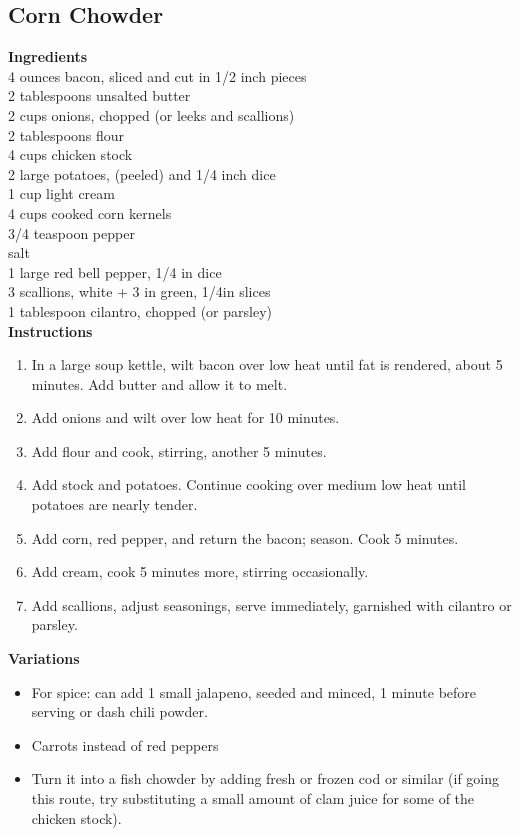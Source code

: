 \documentclass{article}
\numberwithin{figure}{section}
\numberwithin{equation}{section}
\begin{document}
\subsection{Corn Chowder}
{\bf Ingredients}\\
4 ounces bacon, sliced and cut in 1/2 inch pieces\\
2 tablespoons unsalted butter\\
2 cups onions, chopped (or leeks and scallions)\\
2 tablespoons flour\\
4 cups chicken stock\\
2 large potatoes, (peeled) and 1/4 inch dice\\
1 cup light cream\\
4 cups cooked corn kernels\\
3/4 teaspoon pepper\\
salt\\
1 large red bell pepper, 1/4 in dice\\
3 scallions, white + 3 in green, 1/4in slices\\
1 tablespoon cilantro, chopped (or parsley)\\

{\bf Instructions}
\begin{enumerate}
\item In a large soup kettle, wilt bacon over low heat until fat is rendered, about 5 minutes.  Add butter and allow it to melt.
\item Add onions and wilt over low heat for 10 minutes.
\item Add flour and cook, stirring, another 5 minutes.
\item Add stock and potatoes.  Continue cooking over medium low heat until potatoes are nearly tender.
\item Add corn, red pepper, and return the bacon; season.  Cook 5 minutes.
\item Add cream, cook 5 minutes more, stirring occasionally.
\item Add scallions, adjust seasonings, serve immediately, garnished with cilantro or parsley.
\end{enumerate}

{\bf Variations}
\begin{itemize}
\item For spice: can add 1 small jalapeno, seeded and  minced, 1 minute before serving or dash chili powder.
\item Carrots instead of red peppers
\item Turn it into a fish chowder by adding fresh or frozen cod or similar (if going this route, try substituting a small amount of clam juice for some of the chicken stock).
\end{itemize}
\end{document}
